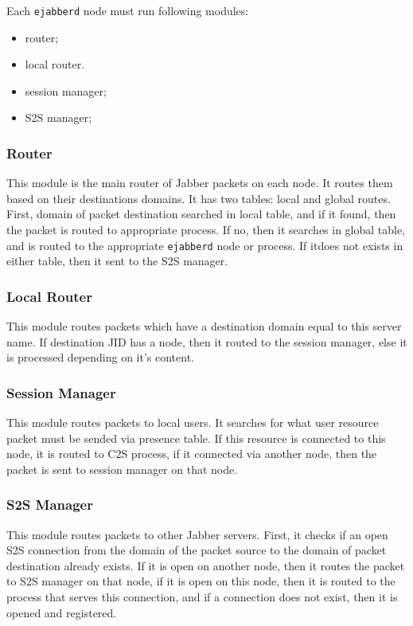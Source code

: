 \documentclass[10pt]{article}
\newcommand{\ejabberd}{\texttt{ejabberd}}
\newcommand{\Jabber}{Jabber}
\begin{document}
Each \ejabberd{} node must run following modules:
\begin{itemize}
\item router;
\item local router.
\item session manager;
\item S2S manager;
\end{itemize}


\subsubsection{Router}

This module is the main router of \Jabber{} packets on each node.  It routes
them based on their destinations domains.  It has two tables: local and global
routes.  First, domain of packet destination searched in local table, and if it
found, then the packet is routed to appropriate process.  If no, then it
searches in global table, and is routed to the appropriate \ejabberd{} node or
process.  If itdoes not exists in either table, then it sent to the S2S
manager.


\subsubsection{Local Router}

This module routes packets which have a destination domain equal to this server
name.  If destination JID has a node, then it routed to the session manager,
else it is processed depending on it's content.


\subsubsection{Session Manager}

This module routes packets to local users.  It searches for what user resource
packet must be sended via presence table.  If this resource is connected to
this node, it is routed to C2S process, if it connected via another node, then
the packet is sent to session manager on that node.


\subsubsection{S2S Manager}

This module routes packets to other \Jabber{} servers.  First, it checks if an
open S2S connection from the domain of the packet source to the domain of
packet destination already exists. If it is open on another node, then it
routes the packet to S2S manager on that node, if it is open on this node, then
it is routed to the process that serves this connection, and if a connection
does not exist, then it is opened and registered.
\end{document}
